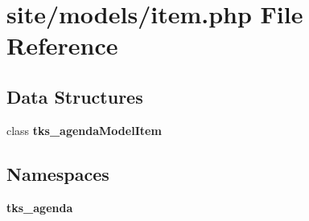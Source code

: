 \section{site/models/item.php File Reference}
\label{site_2models_2item_8php}
\subsection*{Data Structures}
\begin{DoxyCompactItemize}
\item 
class \textbf{ tks\+\_\+agenda\+Model\+Item}
\end{DoxyCompactItemize}
\subsection*{Namespaces}
\begin{DoxyCompactItemize}
\item 
 \textbf{ tks\+\_\+agenda}
\end{DoxyCompactItemize}
